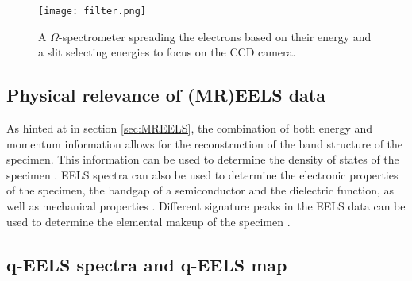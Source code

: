 \begin{figure}
	\centering
	\texttt{[image: filter.png]}
	\caption{A $\Omega$-spectrometer spreading the electrons based on their energy and a slit selecting energies to focus on the CCD camera.}
	\label{fig:filter}
\end{figure}


\subsection{Physical relevance of (MR)EELS data}
As hinted at in section \ref{sec:MREELS}, the combination of both energy and momentum information allows for the reconstruction of the band structure of the specimen. This information can be used to determine the density of states of the specimen \cite{doi:10.1021/acs.nanolett.9b03928} \cite{Egerton_2008}.
EELS spectra can also be used to determine the electronic properties of the specimen, the bandgap of a semiconductor and the dielectric function, as well as mechanical properties \cite{Egerton_2008}.
Different signature peaks in the EELS data can be used to determine the elemental makeup of the specimen \cite{Egerton_2008}.

\subsection{q-EELS spectra and q-EELS map}